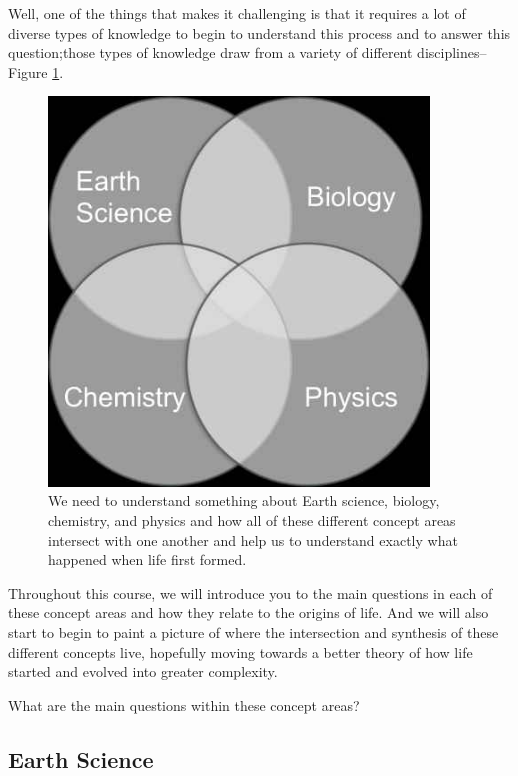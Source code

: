 \documentclass[]{article}
\begin{document}
Well, one of the things that makes it challenging is that it requires a lot of diverse types of knowledge to begin to understand this process and to answer this question;those types of knowledge draw from a variety of different disciplines--Figure \ref{fig:tradional:disciplines}.
\begin{figure}[H]
	\begin{center}
		\caption[Traditional disciplines needed for Origin of Life]{We need to understand something about Earth science, biology, chemistry, and physics and how all of these different concept areas intersect with one another and help us to understand exactly what happened when life first formed.}\label{fig:tradional:disciplines}
		\includegraphics[width=0.9\textwidth]{4mainAreas}
	\end{center}
\end{figure}

Throughout this course, we will introduce you to the main questions in each of these concept areas and how they relate to the origins of life. And we will also start to begin to paint a picture of where the intersection and synthesis of these different concepts live, hopefully moving towards a better theory of how life started and evolved into greater complexity.

What are the main questions within these concept areas? 

\subsection{Earth Science}
\end{document}
